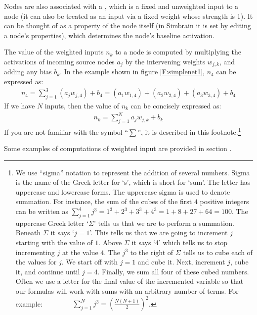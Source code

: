 Nodes are also associated with a , which is a fixed and unweighted input to a node (it can also be treated as an input via a fixed weight whose strength is 1). It can be thought of as a property of the node itself (in Simbrain it is set by editing a node's properties), which determines the node's baseline activation.

The value of the weighted inputs $n_k$ to a node is computed by multiplying the activations of incoming
source nodes $a_j$ by the intervening weights $w_{j,k}$, and adding any bias $b_k$.
In the example shown in figure \ref{F:simplenet1},  $n_4$ can be expressed as:
\begin{eqnarray*}
n_4 = \sum_{j=1}^{3} (a_j w_{j,4})  + b_4 = (a_1 w_{1,4})  + (a_2 w_{2,4}) +
(a_3 w_{3,4}) + b_4
\end{eqnarray*}
If we have $N$ inputs, then the value
of $n_k$ can be concisely expressed as:
\begin{eqnarray*}
n_k = \sum_{j=1}^{N} a_j w_{j,k}  + b_k
\end{eqnarray*}
If you are not familiar with the symbol ``$\sum$'', it is described in this footnote.\footnote{We use ``sigma'' notation to represent the
addition of several numbers. Sigma is the name of the Greek letter for `s',
which is short for `sum'. The letter has uppercase and lowercase forms. The
uppercase sigma is used to denote summation. For instance, the sum of the cubes
of the first $4$ positive integers can be written as
$\displaystyle{\sum_{j=1}^{4} j^3 = 1^3 + 2^3 + 3^3 + 4^3 = 1 + 8 + 27 + 64 =
100}$. The uppercase Greek letter `$\Sigma$' tells us that we are to perform a
summation. Beneath $\Sigma$ it says `$j=1$'. This tells us that we are going
to increment $j$ starting with the value of $1$. Above $\Sigma$ it says `4'
which tells us to stop incrementing $j$ at the value $4$. The $j^3$ to the
right of $\Sigma$ tells us to cube each of the values for $j$. We start off
with $j=1$ and cube it. Next, increment $j$, cube it, and continue until
$j=4$. Finally, we sum all four of these cubed numbers. Often we use a
letter for the final value of the incremented variable so that our formulas
will work with sums with an arbitrary number of terms. For example:
$\displaystyle{\qquad \qquad \sum_{j=1}^{N} j^3 =
\left(\frac{N(N+1)}{2}\right)^2}$.}

Some examples of computations of weighted input are provided in section .

